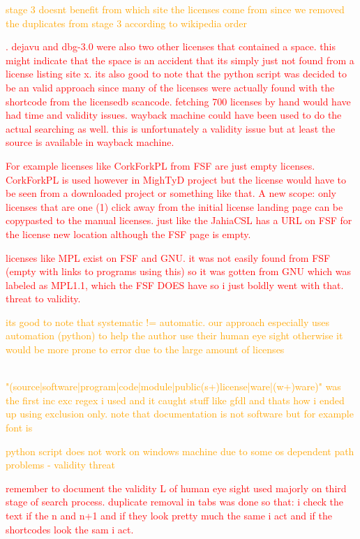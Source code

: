 \textcolor{orange}{stage 3 doesnt benefit from which site the licenses come from since we removed the duplicates from stage 3 according to wikipedia order}

\textcolor{red}{. dejavu and dbg-3.0 were also two other licenses that contained a space. this might indicate that the space is an accident that its simply just not found from a license listing site x. its also good to note that the python script was decided to be an valid approach since many of the licenses were actually found with the shortcode from the licensedb scancode. fetching 700 licenses by hand would have had time and validity issues. wayback machine could have been used to do the actual searching as well. this is unfortunately a validity issue but at least the source is available in wayback machine.}

\textcolor{red}{For example licenses like CorkForkPL from FSF are just empty licenses. CorkForkPL is used however in MighTyD project but the license would have to be seen from a downloaded project or something like that. A new scope: only licenses that are one (1) click away from the initial license landing page can be copypasted to the manual licenses. just like the JahiaCSL has a URL on FSF for the license new location although the FSF page is empty.}

\textcolor{red}{licenses like MPL exist on FSF and GNU. it was not easily found from FSF (empty with links to programs using this) so it was gotten from GNU which was labeled as MPL1.1, which the FSF DOES have so i just boldly went with that. threat to validity.}

\textcolor{orange}{its good to note that systematic != automatic. our approach especially uses automation (python) to help the author use their human eye sight otherwise it would be more prone to error due to the large amount of licenses}

\textcolor{orange}{\\"(source|software|program|code|module|public(s+)license|ware|(w+)ware)" was the first inc exc regex i used and it caught stuff like gfdl and thats how i ended up using exclusion only. note that documentation is not software but for example font is}

\textcolor{orange}{python script does not work on windows machine due to some os dependent path problems - validity threat}

\textcolor{red}{remember to document the validity L of human eye sight used majorly on third stage of search process. duplicate removal in tabs was done so that: i check the text if the n and n+1 and if they look pretty much the same i act and if the shortcodes look the sam i act.}

